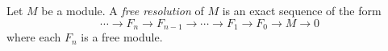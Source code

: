 \documentclass{article}
\begin{document}
Let $M$ be a module.  A {\it free resolution} of $M$
is an exact sequence of the form
$$\cdots \to F_n \to F_{n-1} \to \cdots \to F_1 \to F_0 \to M \to 0$$
where each $F_n$ is a free module.
\end{document}
